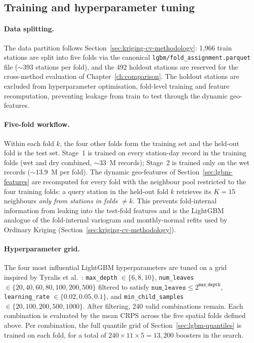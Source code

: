 \subsection{Training and hyperparameter tuning}
\label{sec:lgbm-training}

\paragraph{Data splitting.} The data partition follows
Section~\ref{sec:kriging-cv-methodology}: 1{,}966 train stations are
split into five folds via the canonical
\texttt{lgbm/fold\_assignment.parquet} file (${\sim}393$ stations
per fold), and the 492 holdout stations are reserved for the
cross-method evaluation of Chapter~\ref{ch:comparison}. The holdout
stations are excluded from hyperparameter optimisation, fold-level
training and feature recomputation, preventing leakage from train to
test through the dynamic geo-features.

\paragraph{Five-fold workflow.} Within each fold $k$, the four
other folds form the training set and the held-out fold is the test
set. Stage~1 is trained on every station-day record in the training
folds (wet and dry combined, $\sim$33~M records); Stage~2 is trained
only on the wet records ($\sim$13.9~M per fold). The dynamic
geo-features of Section~\ref{sec:lgbm-features} are recomputed for
every fold with the neighbour pool restricted to the four training
folds: a query station in the held-out fold $k$ retrieves its
$K = 15$ neighbours \emph{only from stations in folds $\ne k$}.
This prevents fold-internal information from leaking into the
test-fold features and is the LightGBM analogue of the fold-internal
variogram and monthly-normal refits used by Ordinary Kriging
(Section~\ref{sec:kriging-cv-methodology}).

\paragraph{Hyperparameter grid.}
\begin{sloppypar}
The four most influential LightGBM hyperparameters are tuned on a grid
inspired by Tyralis et al.~\cite{tyralis2023lightgbm}:
\texttt{max\_depth} $\in \{6, 8, 10\}$, \texttt{num\_leaves}
$\in \{20, 40, 60, 80, 100, 200, 500\}$ filtered to satisfy
$\texttt{num\_leaves} \le 2^{\texttt{max\_depth}}$,
\texttt{learning\_rate} $\in \{0{.}02, 0{.}05, 0{.}1\}$, and
\texttt{min\_child\_samples} $\in \{20, 100, 200, 500, 1000\}$.
After filtering, 240 valid combinations remain. Each combination is
evaluated by the mean CRPS across the five spatial folds defined
above. Per combination, the full quantile grid of
Section~\ref{sec:lgbm-quantiles} is trained on each fold, for a
total of $240 \times 11 \times 5 = 13{,}200$ boosters in the search.
\end{sloppypar}

